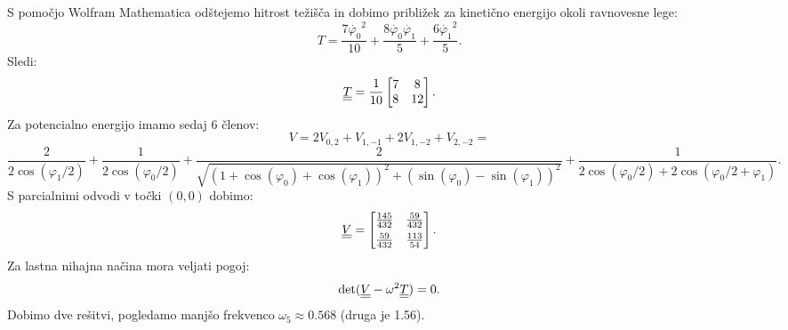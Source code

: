 \documentclass{article}
\begin{document}
S pomočjo Wolfram Mathematica odštejemo hitrost težišča in dobimo približek za kinetično energijo okoli ravnovesne lege:
\begin{equation}
    T=\frac{7\dot{\varphi_0}^2}{10}+\frac{8\dot{\varphi_0}\dot{\varphi_1}}{5}+\frac{6\dot{\varphi_1}^2}{5}.
\end{equation}
Sledi:
\begin{equation}
    \underline{\underline{T}}=\frac{1}{10}\begin{bmatrix}
        7&8\\
        8&12
    \end{bmatrix}.
\end{equation}
Za potencialno energijo imamo sedaj 6 členov:
\begin{equation}
    V=2V_{0,2}+V_{1,-1}+2V_{1,-2}+V_{2,-2}=
\end{equation}
\begin{equation}        
    \frac{2}{2\cos(\varphi_1/2)}+\frac{1}{2\cos(\varphi_0/2)}+\frac{2}{\sqrt{(1+\cos(\varphi_0)+\cos(\varphi_1))^2+(\sin(\varphi_0)-\sin(\varphi_1))^2}}+\frac{1}{2\cos(\varphi_0/2)+2\cos(\varphi_0/2+\varphi_1)}.
\end{equation}
S parcialnimi odvodi v točki $(0,0)$ dobimo:
\begin{equation}
    \underline{\underline{V}}=\begin{bmatrix}
        \frac{145}{432}&\frac{59}{432}\\[1ex]
        \frac{59}{432}&\frac{113}{54}
    \end{bmatrix}.
\end{equation}
Za lastna nihajna načina mora veljati pogoj:
\begin{equation}
    \det(\underline{\underline{V}}-\omega^2\underline{\underline{T}})=0.
\end{equation}
Dobimo dve rešitvi, pogledamo manjšo frekvenco $\omega_5\approx\num{0,568}$ (druga je \num{1,56}).\\
\end{document}
